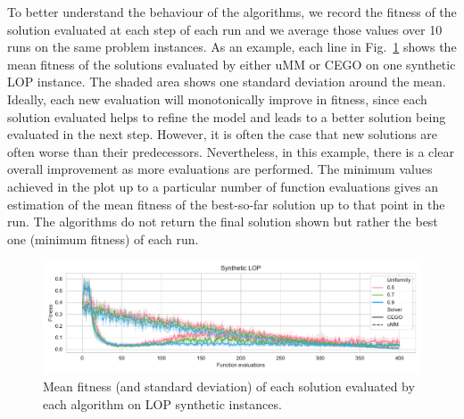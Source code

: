 \documentclass[runningheads]{llncs}
\begin{document}
To better understand the behaviour of the algorithms, we record the fitness of
the solution evaluated at each step of each run and we average those values
over 10 runs on the same problem instances.  As an example, each line in Fig.~\ref{fig:lop_synth} 
shows the mean fitness of the solutions evaluated by either uMM or CEGO on one synthetic LOP
instance. The shaded area shows one standard deviation around the
mean. Ideally, each new evaluation will monotonically improve in fitness, since each solution evaluated helps to refine the model and leads to a
better solution being evaluated in the next step.  However, it is often the case that  
new solutions
are often worse than their predecessors. Nevertheless, in this example, there
is a clear overall improvement as more evaluations are performed. The minimum
values achieved in the plot up to a particular number of function evaluations
gives an estimation of the mean fitness of the best-so-far solution up to that
point in the run. The algorithms do not return the final solution shown but
rather the best one (minimum fitness) of each run.


\begin{figure}[tb]
  \centering%
  \includegraphics[width=\textwidth]{img/synthetic_LOP_combined}
  \caption{Mean fitness  (and standard deviation)  of each solution evaluated by each algorithm on LOP synthetic instances.\label{fig:lop_synth}}
\end{figure}
\end{document}
